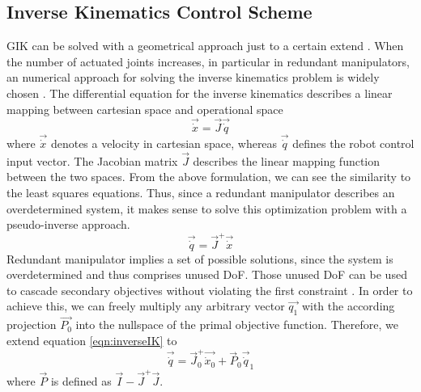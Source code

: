 \subsection{Inverse Kinematics Control Scheme}\label{subsec:ik}
GIK can be solved with a geometrical approach\cite{c1983geometric} just to a certain extend \cite{citeulike:1090825}. When the number of actuated joints increases, in particular in redundant manipulators, an numerical approach for solving the inverse kinematics problem is widely chosen \cite{springer}. The differential equation for the inverse kinematics describes a linear mapping between cartesian space and operational space
\begin{equation}
\vec{\dot{x}} = \vec{J}\vec{\dot{q}}
\end{equation}
where $\vec{\dot{x}}$ denotes a velocity in cartesian space, whereas $\vec{\dot{q}}$ defines the robot control input vector. The Jacobian matrix $\vec{J}$ describes the linear mapping function between the two spaces. From the above formulation, we can see the similarity to the least squares equations. Thus, since a redundant manipulator describes an overdetermined system, it makes sense to solve this optimization problem with a pseudo-inverse approach.
\begin{equation} \label{eqn:inverseIK}
\vec{\dot{q}} = \vec{J}^+\vec{\dot{x}}
\end{equation}
Redundant manipulator implies a set of possible solutions, since the system is overdetermined and thus comprises unused DoF. Those unused DoF can be used to cascade secondary objectives without violating the first constraint \cite{12020}. In order to achieve this, we can freely multiply any arbitrary vector $\vec{q_1}$ with the according projection $\vec{P_0}$ into the nullspace of the primal objective function. Therefore, we extend equation \ref{eqn:inverseIK} to
\begin{equation} \label{eqn:inverseIKnullspace}
\vec{\dot{q}} = \vec{J}_0^+\vec{\dot{x}_0} + \vec{P}_0\vec{\dot{q}}_1 
\end{equation}
where $\vec{P}$ is defined as $\vec{I} - \vec{J}^+\vec{J}$.

